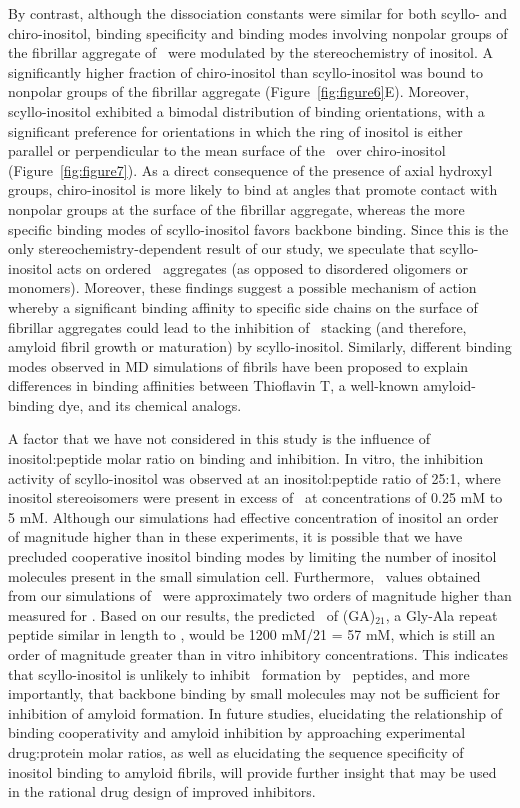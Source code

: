 By contrast, although the dissociation constants were similar for both scyllo- and chiro-inositol, binding specificity and binding modes involving nonpolar groups of the fibrillar aggregate of \gafour\ were modulated by the stereochemistry of inositol. A significantly higher fraction of chiro-inositol than scyllo-inositol was bound to nonpolar groups of the fibrillar aggregate (Figure~\ref{fig:figure6}E). Moreover, scyllo-inositol exhibited a bimodal distribution of binding orientations, with a significant preference for orientations in which the ring of inositol is either parallel or perpendicular to the mean surface of the \bsheet\ over chiro-inositol (Figure~\ref{fig:figure7}). As a direct consequence of the presence of axial hydroxyl groups, chiro-inositol is more likely to bind at angles that promote contact with nonpolar groups at the surface of the fibrillar aggregate, whereas the more specific binding modes of scyllo-inositol favors backbone binding. Since this is the only stereochemistry-dependent result of our study, we speculate that scyllo-inositol acts on ordered \bsheet\ aggregates (as opposed to disordered oligomers or monomers). Moreover, these findings suggest a possible mechanism of action whereby a significant binding affinity to specific side chains on the surface of fibrillar aggregates could lead to the inhibition of \bsheet\ stacking (and therefore, amyloid fibril growth or maturation) by scyllo-inositol. Similarly, different binding modes observed in MD simulations of  fibrils have been proposed to explain differences in binding affinities between Thioflavin T, a well-known amyloid-binding dye, and its chemical analogs.\cite{Mathis:2003p55,Wu:2011p24}

A factor that we have not considered in this study is the influence of inositol:peptide molar ratio on binding and inhibition. In vitro, the inhibition activity of scyllo-inositol was observed at an inositol:peptide ratio of 25:1, where inositol stereoisomers were present in excess of \abeta\ at concentrations of 0.25 mM to 5 mM.\cite{McLaurin:2000p64} Although our simulations had effective concentration of inositol an order of magnitude higher than in these experiments, it is possible that we have precluded cooperative inositol binding modes by limiting the number of inositol molecules present in the small simulation cell. Furthermore, \KD\ values obtained from our simulations of \gafour\ were approximately two orders of magnitude higher than measured for \abeta. Based on our results, the predicted \KD\ of (GA)$_{21}$, a Gly-Ala repeat peptide similar in length to \abeta, would be 1200 mM/21 = 57 mM, which is still an order of magnitude greater than in vitro inhibitory concentrations. This indicates that scyllo-inositol is unlikely to inhibit \bsheet\ formation by \gafour\ peptides, and more importantly, that backbone binding by small molecules may not be sufficient for inhibition of amyloid formation. In future studies, elucidating the relationship of binding cooperativity and amyloid inhibition by approaching experimental drug:protein molar ratios, as well as elucidating the sequence specificity of inositol binding to amyloid fibrils, will provide further insight that may be used in the rational drug design of improved inhibitors.

